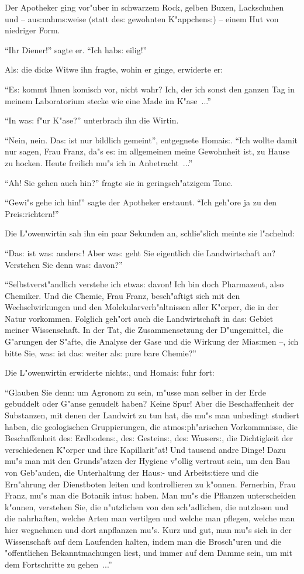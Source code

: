 \documentclass[oneside,12pt]{book}
\newcommand{\s}{s:}%
\begin{document}
Der Apotheker ging vor"uber in schwarzem Rock, gelben Buxen,
Lackschuhen und -- au{\s}nahm{\s}weise (statt de{\s} gewohnten
K"appchen{\s}) -- einem Hut von niedriger Form.

"`Ihr Diener!"' sagte er. "`Ich hab{\s} eilig!"'

Al{\s} die dicke Witwe ihn fragte, wohin er ginge, erwiderte er:

"`E{\s} kommt Ihnen komisch vor, nicht wahr? Ich, der ich sonst
den ganzen Tag in meinem Laboratorium stecke wie eine Made im
K"ase~..."'

"`In wa{\s} f"ur K"ase?"' unterbrach ihn die Wirtin.

"`Nein, nein. Da{\s} ist nur bildlich gemeint"', entgegnete
Homai{\s}. "`Ich wollte damit nur sagen, Frau Franz, da"s e{\s} im
allgemeinen meine Gewohnheit ist, zu Hause zu hocken. Heute
freilich mu"s ich in Anbetracht~..."'

"`Ah! Sie gehen auch hin?"' fragte sie in geringsch"atzigem Tone.

"`Gewi"s gehe ich hin!"' sagte der Apotheker erstaunt. "`Ich
geh"ore ja zu den Prei{\s}richtern!"'

Die L"owenwirtin sah ihn ein paar Sekunden an, schlie"slich meinte
sie l"achelnd:

"`Da{\s} ist wa{\s} ander{\s}! Aber wa{\s} geht Sie eigentlich die
Landwirtschaft an? Verstehen Sie denn wa{\s} davon?"'

"`Selbstverst"andlich verstehe ich etwa{\s} davon! Ich bin doch
Pharmazeut, also Chemiker. Und die Chemie, Frau Franz,
besch"aftigt sich mit den Wechselwirkungen und den
Molekularverh"altnissen aller K"orper, die in der Natur vorkommen.
Folglich geh"ort auch die Landwirtschaft in da{\s} Gebiet meiner
Wissenschaft. In der Tat, die Zusammensetzung der D"ungemittel,
die G"arungen der S"afte, die Analyse der Gase und die Wirkung der
Mia{\s}men --, ich bitte Sie, wa{\s} ist da{\s} weiter al{\s} pure
bare Chemie?"'

Die L"owenwirtin erwiderte nicht{\s}, und Homai{\s} fuhr fort:

"`Glauben Sie denn: um Agronom zu sein, m"usse man selber in der
Erde gebuddelt oder G"anse genudelt haben? Keine Spur! Aber die
Beschaffenheit der Substanzen, mit denen der Landwirt zu tun hat,
die mu"s man unbedingt studiert haben, die geologischen
Gruppierungen, die atmo{\s}ph"arischen Vorkommnisse, die
Beschaffenheit de{\s} Erdboden{\s}, de{\s} Gestein{\s}, de{\s}
Wasser{\s}, die Dichtigkeit der verschiedenen K"orper und ihre
Kapillarit"at! Und tausend andre Dinge! Dazu mu"s man mit den
Grunds"atzen der Hygiene v"ollig vertraut sein, um den Bau von
Geb"auden, die Unterhaltung der Hau{\s}- und Arbeit{\s}tiere und
die Ern"ahrung der Dienstboten leiten und kontrollieren zu
k"onnen. Fernerhin, Frau Franz, mu"s man die Botanik intu{\s}
haben. Man mu"s die Pflanzen unterscheiden k"onnen, verstehen Sie,
die n"utzlichen von den sch"adlichen, die nutzlosen und die
nahrhaften, welche Arten man vertilgen und welche man pflegen,
welche man hier wegnehmen und dort anpflanzen mu"s. Kurz und gut,
man mu"s sich in der Wissenschaft auf dem Laufenden halten, indem
man die Brosch"uren und die "offentlichen Bekanntmachungen liest,
und immer auf dem Damme sein, um mit dem Fortschritte zu
gehen~..."'
\end{document}
